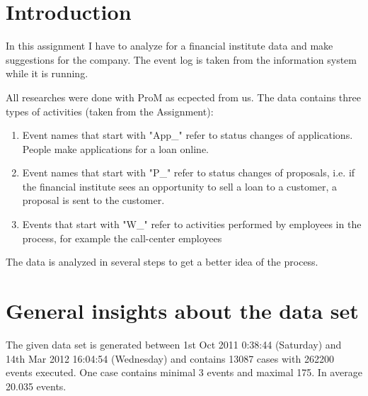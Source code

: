 \section{Introduction}
In this assignment I have to analyze for a financial institute data and make suggestions for the company. The event log is taken from the information system while it is running. 

All researches were done with ProM as ecpected from us. The data contains three types of activities (taken from the Assignment):

\begin{enumerate}
	\item Event names that start with "App\_" refer to status changes of applications. People make applications for a loan online.
	\item Event names that start with "P\_" refer to status changes of proposals, i.e. if the financial institute sees an opportunity to sell a loan to a customer, a proposal is sent to the customer.
	\item Events that start with "W\_" refer to activities performed by employees in the process, for example the call-center employees
\end{enumerate}

The data is analyzed in several steps to get a better idea of the process.

\section{General insights about the data set}

The given data set is generated between 1st Oct 2011 0:38:44 (Saturday) and 14th Mar 2012 16:04:54 (Wednesday) and contains 13087 cases with 262200 events executed. One case contains minimal 3 events and maximal 175. In average 20.035 events.

